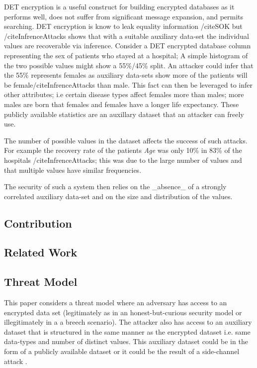 \documentclass[journal]{IEEEtran}
\begin{document}
DET encryption is a useful construct for building encrypted databases as it performs well, does not suffer from significant message expansion, and  permits searching. DET encryption is know to leak equality information /cite{SOK} but /cite{InfrenceAttacks} shows that with a suitable auxiliary data-set the individual values are recoverable via inference. Consider a DET encrypted database column representing the sex of patients who stayed at a hospital; A simple histogram of the two possible values might show a 55\%/45\% split. An attacker could infer that the 55\% represents females as auxiliary data-sets show more of the patients will be female/cite{InfrenceAttacks} than male. This fact can then be leveraged to infer other attributes; i.e certain disease types affect females more than males; more males are born that females and females have a longer life expectancy. These publicly available statistics are an auxillary dataset that an attacker can freely use. 

The number of possible values in the dataset affects the success of such attacks. For example the recovery rate of the patients \textit{ Age} was only 10\% in 83\% of the hospitals /cite{InfrenceAttacks}; this was due to the large number of values and that multiple values have similar frequencies.

The security of such a system then relies on the \_absence\_ of a strongly correlated auxiliary data-set and on the size and distribution of the values.
\subsection{Contribution}
\subsection{Related Work}
\subsection{Threat Model}
This paper considers a threat model where an adversary has access to an encrypted data set (legitimately as in an honest-but-curious security model or illegitimately in a a breech scenario). The attacker also has access to an auxiliary dataset that is structured in the same manner as the encrypted dataset i.e. same data-types and number of distinct values. This auxiliary dataset could be in the form of a publicly available dataset or it could be the result of a side-channel attack \cite{Kocher96}.
\todo[inline]{[Adversarial Goals 100 words
	Adversarial information 500
	Auxiliary Dataset 500}
\end{document}
